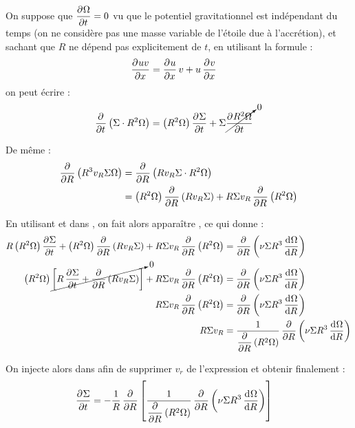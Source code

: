 \bigskip

On suppose que $\mathinner{ \dfrac{\partial{^{}}\Omega}{\partial{{t}^{}}} }=0$ vu que le potentiel gravitationnel est indépendant du temps (on ne considère pas une masse variable de l'étoile due à l'accrétion), et sachant que $R$ ne dépend pas explicitement de $t$, en utilisant la formule : 
\begin{align*}
\mathinner{ \dfrac{\partial{^{}}uv}{\partial{{x}^{}}} } &= \mathinner{ \dfrac{\partial{^{}}u}{\partial{{x}^{}}} }v + u\mathinner{ \dfrac{\partial{^{}}v}{\partial{{x}^{}}} }
\end{align*}
on peut écrire :
\begin{align}
\mathinner{ \dfrac{\partial{^{}}}{\partial{{t}^{}}} }\left(\Sigma\cdot R^2\Omega\right) &= \left(R^2\Omega\right)\mathinner{ \dfrac{\partial{^{}}\Sigma}{\partial{{t}^{}}} } + \Sigma\cancelto{0}{\mathinner{ \dfrac{\partial{^{}}R^2\Omega}{\partial{{t}^{}}} }}\label{eq:ang_mom_tmp_01}
\end{align}

De même : 
\begin{align}
\dpd{}{R}\left(R^3 v_R \Sigma \Omega\right) &= \dpd{}{R}\left(R v_R \Sigma \cdot R^2\Omega\right)\nonumber\\
&= \left(R^2\Omega\right)\dpd{}{R}\left(R v_R \Sigma\right) + R \Sigma v_R \dpd{}{R}\left(R^2\Omega\right)\label{eq:ang_mom_tmp_02}
\end{align}

En utilisant  et  dans , on fait alors apparaître , ce qui donne : 
\begin{align}
R\left(R^2\Omega\right)\dpd{\Sigma}{t} + \left(R^2\Omega\right)\dpd{}{R}\left(R v_R \Sigma\right) + R \Sigma v_R \dpd{}{R}\left(R^2\Omega\right) &= \dpd{}{R}\left(\nu \Sigma R^3 \dod{\Omega}{R}\right)\nonumber\\
\left(R^2\Omega\right)\cancelto{0}{\left[R\dpd{\Sigma}{t} + \dpd{}{R}\left(R v_R \Sigma\right)\right]} + R \Sigma v_R \dpd{}{R}\left(R^2\Omega\right) &= \dpd{}{R}\left(\nu \Sigma R^3 \dod{\Omega}{R}\right)\nonumber\\
R \Sigma v_R \dpd{}{R}\left(R^2\Omega\right) &= \dpd{}{R}\left(\nu \Sigma R^3 \dod{\Omega}{R}\right)\nonumber\\
R \Sigma v_R &= \inv{\dpd{}{R}\left(R^2\Omega\right)} \dpd{}{R}\left(\nu \Sigma R^3 \dod{\Omega}{R}\right)\label{eq:r_sigma_vr}
\end{align}

\bigskip

On injecte alors  dans  afin de supprimer $v_r$ de l'expression et obtenir finalement : 
\begin{align*}
\mathinner{ \dfrac{\partial{^{}}\Sigma}{\partial{{t}^{}}} } &= -\frac{1}{R}\mathinner{ \dfrac{\partial{^{}}}{\partial{{R}^{}}} }\left[\frac{1}{\mathinner{ \dfrac{\partial{^{}}}{\partial{{R}^{}}} }\left(R^2\Omega\right)} \mathinner{ \dfrac{\partial{^{}}}{\partial{{R}^{}}} }\left(\nu \Sigma R^3 \mathinner{ \dfrac{\operatorname{d \!}{^{}}\Omega}{\operatorname{d \!}{{R}^{}}} }\right)\right]
\end{align*}

